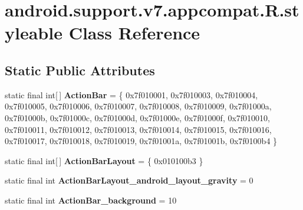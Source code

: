 \hypertarget{classandroid_1_1support_1_1v7_1_1appcompat_1_1_r_1_1styleable}{}\section{android.\+support.\+v7.\+appcompat.\+R.\+styleable Class Reference}
\label{classandroid_1_1support_1_1v7_1_1appcompat_1_1_r_1_1styleable}
\subsection*{Static Public Attributes}
\begin{DoxyCompactItemize}
\item 
\hypertarget{classandroid_1_1support_1_1v7_1_1appcompat_1_1_r_1_1styleable_a5941dc15714398e9ec9afaa0155cc1cf}{}static final int\mbox{[}$\,$\mbox{]} {\bfseries Action\+Bar} = \{ 0x7f010001, 0x7f010003, 0x7f010004, 0x7f010005, 0x7f010006, 0x7f010007, 0x7f010008, 0x7f010009, 0x7f01000a, 0x7f01000b, 0x7f01000c, 0x7f01000d, 0x7f01000e, 0x7f01000f, 0x7f010010, 0x7f010011, 0x7f010012, 0x7f010013, 0x7f010014, 0x7f010015, 0x7f010016, 0x7f010017, 0x7f010018, 0x7f010019, 0x7f01001a, 0x7f01001b, 0x7f0100b4 \}\label{classandroid_1_1support_1_1v7_1_1appcompat_1_1_r_1_1styleable_a5941dc15714398e9ec9afaa0155cc1cf}

\item 
\hypertarget{classandroid_1_1support_1_1v7_1_1appcompat_1_1_r_1_1styleable_a130715398cd11a55fefd1a376c18092e}{}static final int\mbox{[}$\,$\mbox{]} {\bfseries Action\+Bar\+Layout} = \{ 0x010100b3 \}\label{classandroid_1_1support_1_1v7_1_1appcompat_1_1_r_1_1styleable_a130715398cd11a55fefd1a376c18092e}

\item 
\hypertarget{classandroid_1_1support_1_1v7_1_1appcompat_1_1_r_1_1styleable_a2e2986ce84f44ed522b12156ab4c80b5}{}static final int {\bfseries Action\+Bar\+Layout\+\_\+android\+\_\+layout\+\_\+gravity} = 0\label{classandroid_1_1support_1_1v7_1_1appcompat_1_1_r_1_1styleable_a2e2986ce84f44ed522b12156ab4c80b5}

\item 
\hypertarget{classandroid_1_1support_1_1v7_1_1appcompat_1_1_r_1_1styleable_a9b51f8b4bd472a2d03b0839a309d3701}{}static final int {\bfseries Action\+Bar\+\_\+background} = 10\label{classandroid_1_1support_1_1v7_1_1appcompat_1_1_r_1_1styleable_a9b51f8b4bd472a2d03b0839a309d3701}


\end{DoxyCompactItemize}
